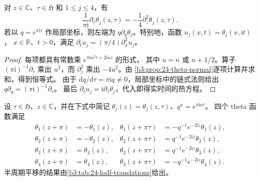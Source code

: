 \begin{proposition}\label{b3:prop:24-theta-heat}
对 \(z\in\mathbb C\)、\(\tau\in\mathfrak H\) 和 \(1\le j\le4\)，有
\begin{equation}\label{b3:eq:24-theta-heat}
 \frac1{\pi\mathrm i}\partial_\tau\theta_j(z,\tau)
       =-\frac14\partial_z^2\theta_j(z,\tau).
\end{equation}
若以 \(q=e^{\pi\mathrm i\tau}\) 作局部坐标，则左端为
\(q\partial_q\theta_j\)。特别地，函数 \(u_j(x,t)=\theta_j(x,\mathrm it)\)，
\(x\in\mathbb R\)、\(t>0\)，满足
\(\partial_tu_j=(\pi/4)\partial_x^2u_j\)。
\end{proposition}
\begin{proof}
每项都具有常数乘 \(e^{\pi\mathrm i u^2\tau+2\mathrm iuz}\) 的形式，
其中 \(u=n\) 或 \(n+1/2\)。算子 \((\pi\mathrm i)^{-1}\partial_\tau\)
乘出 \(u^2\)，而 \(\partial_z^2\) 乘出 \(-4u^2\)。由
\cref{b3:prop:24-theta-normal}逐项计算并求和，得到恒等式。
由于 \(\mathrm dq/\mathrm d\tau=\pi\mathrm i q\ne0\)，局部坐标中的链式法则给出 \(q\partial_q=(\pi\mathrm i)^{-1}\partial_\tau\)。
最后 \(\partial_tu_j=\mathrm i\partial_\tau\theta_j\)，代入即得实时间的热方程。
\end{proof}

\begin{proposition}\label{b3:prop:24-theta-translations}
设 \(\tau\in\mathfrak H\)、\(z\in\mathbb C\)，并在下式中简记
\(\theta_j(z)=\theta_j(z,\tau)\)、\(q^a=e^{\pi\mathrm i a\tau}\)。
四个 theta 函数满足
\begin{equation}\label{b3:eq:24-theta-quasiperiods}
\begin{aligned}
 \theta_1(z+\pi)&=-\theta_1(z),&
 \theta_1(z+\pi\tau)&=-q^{-1}e^{-2\mathrm iz}\theta_1(z),\\
 \theta_2(z+\pi)&=-\theta_2(z),&
 \theta_2(z+\pi\tau)&=q^{-1}e^{-2\mathrm iz}\theta_2(z),\\
 \theta_3(z+\pi)&=\theta_3(z),&
 \theta_3(z+\pi\tau)&=q^{-1}e^{-2\mathrm iz}\theta_3(z),\\
 \theta_4(z+\pi)&=\theta_4(z),&
 \theta_4(z+\pi\tau)&=-q^{-1}e^{-2\mathrm iz}\theta_4(z).
\end{aligned}
\end{equation}
半周期平移的结果由\cref{b3:tab:24-half-translations}给出。
\end{proposition}


